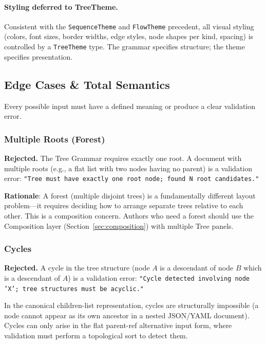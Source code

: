 \paragraph{Styling deferred to TreeTheme.}
Consistent with the \texttt{SequenceTheme} and \texttt{FlowTheme} precedent, all visual styling (colors, font sizes, border widths, edge styles, node shapes per kind, spacing) is controlled by a \texttt{TreeTheme} type. The grammar specifies structure; the theme specifies presentation.

\subsection{Edge Cases \& Total Semantics}
\label{sec:tree-edge-cases}

Every possible input must have a defined meaning or produce a clear validation error.

\subsubsection{Multiple Roots (Forest)}

\textbf{Rejected.} The Tree Grammar requires exactly one root. A document with multiple roots (e.g., a flat list with two nodes having no parent) is a validation error: \texttt{"Tree must have exactly one root node; found N root candidates."}

\textbf{Rationale}: A forest (multiple disjoint trees) is a fundamentally different layout problem---it requires deciding how to arrange separate trees relative to each other. This is a composition concern. Authors who need a forest should use the Composition layer (Section~\ref{sec:composition}) with multiple Tree panels.

\subsubsection{Cycles}

\textbf{Rejected.} A cycle in the tree structure (node $A$ is a descendant of node $B$ which is a descendant of $A$) is a validation error: \texttt{"Cycle detected involving node 'X'; tree structures must be acyclic."}

In the canonical children-list representation, cycles are structurally impossible (a node cannot appear as its own ancestor in a nested JSON/YAML document). Cycles can only arise in the flat parent-ref alternative input form, where validation must perform a topological sort to detect them.

